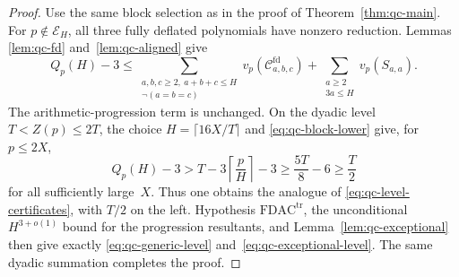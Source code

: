 \begin{proof}
Use the same block selection as in the proof of
Theorem~\ref{thm:qc-main}.  For $p\notin\mathcal E_H$, all three
fully deflated polynomials have nonzero reduction.  Lemmas
\ref{lem:qc-fd} and~\ref{lem:qc-aligned} give
\[
 Q_p(H)-3\le
 \sum_{\substack{a,b,c\ge2,\ a+b+c\le H\\
                   \neg(a=b=c)}}
 v_p(\mathcal C^{\mathrm{fd}}_{a,b,c})
 +\sum_{\substack{a\ge2\\3a\le H}}v_p(S_{a,a}).
\]
The arithmetic-progression term is unchanged.  On the dyadic level
$T<Z(p)\le2T$, the choice $H=\lceil16X/T\rceil$ and
\eqref{eq:qc-block-lower} give, for $p\le2X$,
\[
 Q_p(H)-3
 >T-3\left\lceil\frac pH\right\rceil-3
 \ge \frac{5T}{8}-6\ge\frac T2
\]
for all sufficiently large~$X$.  Thus one obtains the analogue of
\eqref{eq:qc-level-certificates}, with $T/2$ on the left.  Hypothesis
$\mathrm{FDAC}^{\mathrm{tr}}$, the unconditional
$H^{3+o(1)}$ bound for the progression resultants, and
Lemma~\ref{lem:qc-exceptional} then give exactly
\eqref{eq:qc-generic-level} and~\eqref{eq:qc-exceptional-level}.
The same dyadic summation completes the proof.
\end{proof}

